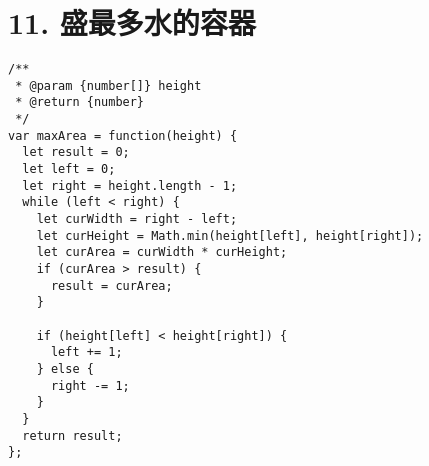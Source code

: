 \newpage
\section{11. 盛最多水的容器}
\label{leetcode:11}

\begin{verbatim}
/**
 * @param {number[]} height
 * @return {number}
 */
var maxArea = function(height) {
  let result = 0;
  let left = 0;
  let right = height.length - 1;
  while (left < right) {
    let curWidth = right - left;
    let curHeight = Math.min(height[left], height[right]);
    let curArea = curWidth * curHeight;
    if (curArea > result) {
      result = curArea;
    }

    if (height[left] < height[right]) {
      left += 1;
    } else {
      right -= 1;
    }
  }
  return result;
};
\end{verbatim}
